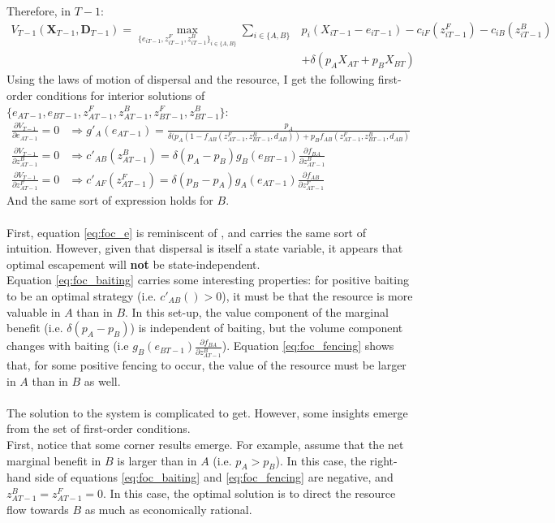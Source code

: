 \documentclass{article}
\begin{document}
Therefore, in $T-1$:
\begin{align*}
    V_{T-1}(\mathbf{X}_{T-1}, \mathbf{D}_{T-1}) = \max_{\{e_{iT-1}, z_{iT-1}^F, z_{iT-1}^B \}_{i \in \{A,B\}}} \sum_{i \in \{A,B\}} & p_i(X_{iT-1} - e_{iT-1}) - c_{iF}(z_{iT-1}^F) - c_{iB}(z_{iT-1}^B) \\&+ \delta (p_A X_{AT} + p_B X_{BT})
\end{align*}
Using the laws of motion of dispersal and the resource, I get the following first-order conditions for interior solutions of $\{e_{AT-1}, e_{BT-1}, z_{AT-1}^F, z_{AT-1}^B, z_{BT-1}^F, z_{BT-1}^B\}$:
\begin{align}
    \frac{\partial V_{T-1}}{\partial e_{AT-1}} = 0 &\Rightarrow g'_A(e_{AT-1}) = \frac{p_A}{\delta (p_A (1-f_{AB}(z_{AT-1}^F, z_{BT-1}^B, d_{AB}))+ p_B f_{AB}(z_{AT-1}^F, z_{BT-1}^B, d_{AB})} \label{eq:foc_e}\\
    \frac{\partial V_{T-1}}{\partial z_{AT-1}^B} = 0 &\Rightarrow c'_{AB}(z_{AT-1}^B) = \delta (p_A - p_B) g_B(e_{BT-1} )\frac{\partial f_{BA}}{\partial z_{AT-1}^B} \label{eq:foc_baiting}\\
    \frac{\partial V_{T-1}}{\partial z_{AT-1}^F} = 0 &\Rightarrow c'_{AF}(z_{AT-1}^F) = \delta (p_B - p_A) g_A(e_{AT-1} )\frac{\partial f_{AB}}{\partial z_{AT-1}^F} \label{eq:foc_fencing}
\end{align}
And the same sort of expression holds for $B$. \\\\
First, equation \ref{eq:foc_e} is reminiscent of \cite{costello_optimal_2008}, and carries the same sort of intuition. However, given that dispersal is itself a state variable, it appears that optimal escapement will \textbf{not} be state-independent. \\
Equation \ref{eq:foc_baiting} carries some interesting properties: for positive baiting to be an optimal strategy (i.e. $c'_{AB}()>0$), it must be that the resource is more valuable in $A$ than in $B$. In this set-up, the value component of the marginal benefit (i.e. $\delta (p_A - p_B)$) is independent of baiting, but the volume component changes with baiting (i.e $g_B(e_{BT-1})\frac{\partial f_{BA}}{\partial z_{AT-1}^B}$). Equation \ref{eq:foc_fencing} shows that, for some positive fencing to occur, the value of the resource must be larger in $A$ than in $B$ as well. \\\\
The solution to the system is complicated to get. However, some insights emerge from the set of first-order conditions.\\
First, notice that some corner results emerge. For example, assume that the net marginal benefit in $B$ is larger than in $A$ (i.e. $p_A>p_B$). In this case, the right-hand side of equations \ref{eq:foc_baiting} and \ref{eq:foc_fencing} are negative, and $z_{AT-1}^B = z_{AT-1}^F=0$. In this case, the optimal solution is to direct the resource flow towards $B$ as much as economically rational. \\
\end{document}
